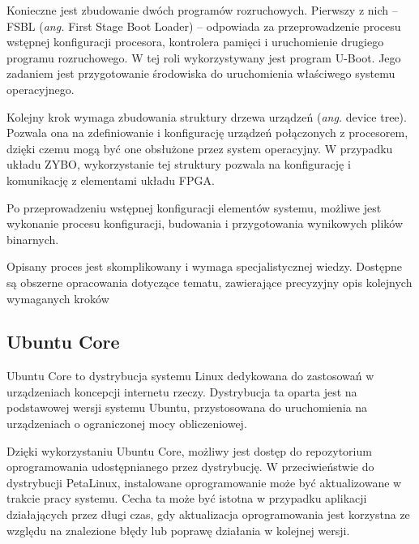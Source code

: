 Konieczne jest zbudowanie dwóch programów rozruchowych. %
Pierwszy z nich -- FSBL (\emph{ang.} First Stage Boot Loader) -- odpowiada za przeprowadzenie procesu wstępnej konfiguracji procesora, kontrolera pamięci i uruchomienie drugiego programu rozruchowego. 
W tej roli wykorzystywany jest program U-Boot. 
Jego zadaniem jest przygotowanie środowiska do uruchomienia właściwego systemu operacyjnego.

Kolejny krok wymaga zbudowania struktury drzewa urządzeń (\emph{ang.} device tree). 
Pozwala ona na zdefiniowanie i konfigurację urządzeń połączonych z procesorem, dzięki czemu mogą być one obsłużone przez system operacyjny. 
W przypadku układu ZYBO, wykorzystanie tej struktury pozwala na konfigurację i komunikację z elementami układu FPGA. %

Po przeprowadzeniu wstępnej konfiguracji elementów systemu, możliwe jest wykonanie procesu konfiguracji, budowania i przygotowania wynikowych plików binarnych.

Opisany proces jest skomplikowany i wymaga specjalistycznej wiedzy. 
Dostępne są obszerne opracowania dotyczące tematu, zawierające precyzyjny opis kolejnych wymaganych kroków \cite{zybo-zynq-getting-started,zybo-stock-linux,xilinx-build-kernel}


\subsection{Ubuntu Core}

Ubuntu Core to dystrybucja systemu Linux dedykowana do zastosowań w urządzeniach koncepcji internetu rzeczy. %
Dystrybucja ta oparta jest na podstawowej wersji systemu Ubuntu, przystosowana do uruchomienia na urządzeniach o ograniczonej mocy obliczeniowej.

Dzięki wykorzystaniu Ubuntu Core, możliwy jest dostęp do repozytorium oprogramowania udostępnianego przez dystrybucję. 
W przeciwieństwie do dystrybucji PetaLinux, instalowane oprogramowanie może być aktualizowane w trakcie pracy systemu. 
Cecha ta może być istotna w przypadku aplikacji działających przez długi czas, gdy aktualizacja oprogramowania jest korzystna ze względu na znalezione błędy lub poprawę działania w kolejnej wersji. %


